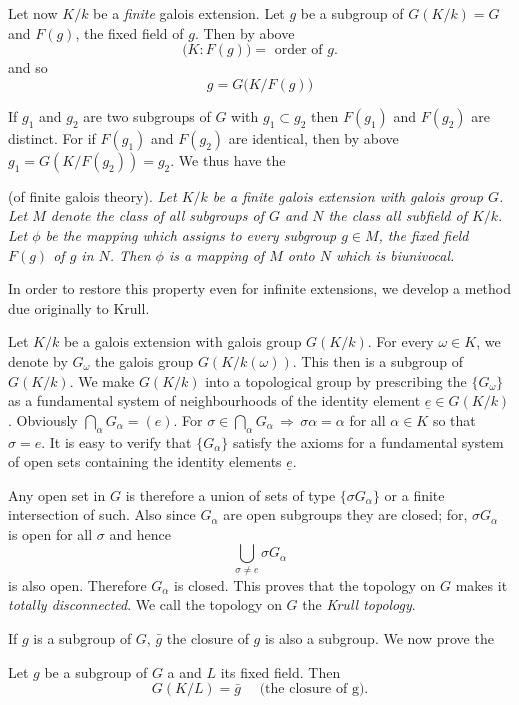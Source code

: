Let now $K/k$ be a \textit{finite} galois extension. Let $g$ be a
subgroup of $G(K/k) = G$ and $F(g)$, the fixed field of $g$. Then by
above  
$$
\bigg( K : F(g) \bigg) = \text{ order of } g.
$$
and so
$$
g = G\big( K/F(g) \big)
$$

If $g_1$ and $g_2$ are two subgroups of $G$ with $g_1 \subset g_2$
then $F(g_1)$ and $F(g_2)$ are distinct. For if $F(g_1)$ and $F(g_2)$
are identical, then by above $g_1 = G(K/F (g_2)) = g_2$. We thus have
the  

\medskip
{}(of finite galois theory).
 \textit{Let $K/k$ be a finite galois extension
    with galois group $G$. Let $M$ denote the class of all
    subgroups of $G$ and $N$ the class all subfield of
  $K/k$. Let $\phi$  be the mapping which assigns to every
    subgroup $g \in M$, the fixed field $F(g)$ of $g$ in
  $N$. Then $\phi $ is a mapping of $M$ onto $N$  which is
    biunivocal.} 

In order to restore this property even for infinite extensions, we
develop a method due originally to Krull. 

Let $K/k$ be a galois extension with galois group $G(K/k )$. For every
$\omega \in K$, we denote by $G_{\omega}$ the galois group
$G(K/k(\omega))$. This then is a subgroup of $G(K/k)$. We make
$G(K/k)$ into a topological group by prescribing the $\{G_\omega \}$
as a fundamental system of neighbourhoods of the identity element
$\underline{e} \in G(K/k)$. Obviously 
$\bigcap \limits_\alpha G_\alpha = (e)$. For $ \sigma \in
\bigcap_{\alpha} G_{\alpha} \, \Rightarrow \, \sigma
\alpha = \alpha$ for all $\alpha \in K$ so that $\sigma = e$. It is
easy to verify that $\{ G_\alpha \}$ satisfy the axioms\pageoriginale
for a fundamental system of open sets containing the identity elements 
$\underline{e}$.  

Any open set in $G$ is therefore a union of sets of type $\{ \sigma
G_\alpha \}$ or a finite intersection of such. Also since $G_{\alpha}$
are open subgroups they are closed; for, $\sigma G_\alpha$ is open for
all $\sigma $ and hence  
$$
\bigcup_{\sigma \neq e} \sigma G_{\alpha}
$$
is also open. Therefore $G_{\alpha} $ is closed. This proves that the
topology on $G$ makes it \textit{totally disconnected}. We call the
topology on $G$ the \textit{Krull topology}. 

If $g$ is a subgroup of $G$, $\bar{g}$ the closure of $g$ is also a
subgroup. We now prove the  

\begin{lemma*}
Let $g$ be a subgroup of $G$ a and $L$ its fixed field. Then
$$
G(K/L) = \bar{g} \quad \text{ (the closure of g)}.
$$
 \end{lemma*} 

